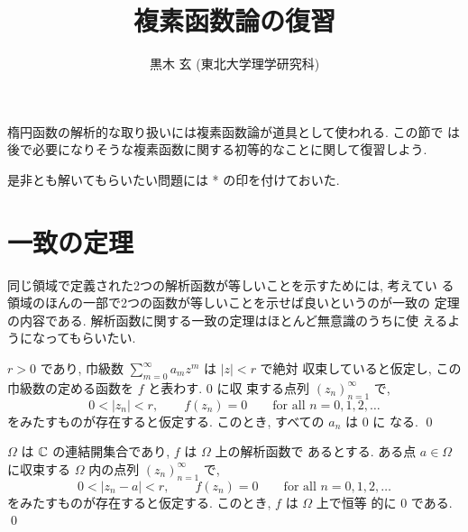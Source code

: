 \documentclass[12pt,twoside]{jarticle}
\begin{document}

\title{\bfseries 複素函数論の復習}

\author{黒木 玄 \quad (東北大学理学研究科)}

\date{\VERSION}

\maketitle



\begin{small}
\tableofcontents
\end{small}

\bigskip\bigskip\bigskip

楕円函数の解析的な取り扱いには複素函数論が道具として使われる. この節で
は後で必要になりそうな複素函数に関する初等的なことに関して復習しよう.

\medskip\noindent %
{\Large 是非とも解いてもらいたい問題には * の印を付けておいた.}


\section{一致の定理}

\medskip

同じ領域で定義された2つの解析函数が等しいことを示すためには, 考えてい
る領域のほんの一部で2つの函数が等しいことを示せば良いというのが一致の
定理の内容である. 解析函数に関する一致の定理はほとんど無意識のうちに使
えるようになってもらいたい.

\begin{question}
  $r>0$ であり, 巾級数 $\sum_{m=0}^{\infty} a_m z^m$ は $|z|<r$ で絶対
  収束していると仮定し, この巾級数の定める函数を $f$ と表わす. $0$ に収
  束する点列 $(z_n)_{n=1}^{\infty}$ で, 
  \[
    0 < |z_n| < r,
    \qquad  f(z_n)=0
    \qquad \text{for all $n=0,1,2,\dots$}
  \]%
  をみたすものが存在すると仮定する. このとき, すべての $a_n$ は $0$ に
  なる. \qed
\end{question}

\begin{question}[一致の定理]
  $\Omega$ は ${\mathbb C}$ の連結開集合であり, $f$ は $\Omega$ 上の解析函数で
  あるとする. ある点 $a\in\Omega$ に収束する $\Omega$ 内の点列 
  $(z_n)_{n=1}^{\infty}$ で,
  \[
    0 < |z_n - a| < r,
    \qquad  f(z_n)=0
    \qquad \text{for all $n=0,1,2,\dots$}
  \]%
  をみたすものが存在すると仮定する. このとき, $f$ は $\Omega$ 上で恒等
  的に $0$ である. \qed
\end{question}
\end{document}
